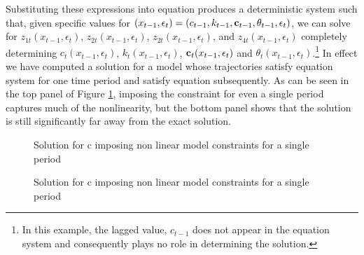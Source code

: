 \documentclass[12pt]{article}
\begin{document}
Substituting  these expressions into equation  produces
a deterministic system such that, given specific values for 
$(x_{t-1},\epsilon_{t})=(c_{t-1}, k_{t-1},{\mathbf{c}}_{t-1}, \theta_{t-1}, \epsilon_t)$, we can solve for $z_{1t}(x_{t-1},\epsilon_{t})$, $z_{2t}(x_{t-1},\epsilon_{t})$, $z_{2t}(x_{t-1},\epsilon_{t})$, and $z_{4t}(x_{t-1},\epsilon_{t})$  completely determining
$c_{t}(x_{t-1},\epsilon_{t})$, $k_{t}(x_{t-1},\epsilon_{t})$, ${\mathbf{c}}_{t}(x_{t-1},\epsilon_{t})$  and $\theta_{t}(x_{t-1},\epsilon_{t})$.\footnote{In this example, the lagged value,  $c_{t-1}$ does not appear in the equation system and consequently plays no role in determining the solution.}  In effect we have 
computed a solution for a model whose trajectories satisfy equation system 
for one time period and satisfy equation  subsequently. As can
be seen in the top panel of Figure \ref{fig:cfuncfirst}, 
imposing the constraint for even a single period captures much of the nonlinearity, but the bottom panel shows that the solution is 
still significantly far away from the exact solution.

\begin{figure}
  \centering
  \caption{Solution for c imposing non linear model constraints for a single period}
  \caption{Solution for c imposing non linear model constraints for a single period}
  \label{fig:cfuncfirst}
\end{figure}
\end{document}
